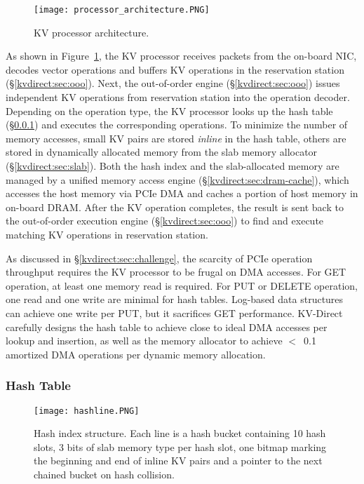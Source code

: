 \begin{figure}[t]
\centering
\texttt{[image: processor\_architecture.PNG]}
\caption{KV processor architecture.}
\label{kvdirect:fig:kvprocessor-arch}

\end{figure}

As shown in Figure~\ref{kvdirect:fig:kvprocessor-arch}, the KV processor receives packets from the on-board NIC, decodes vector operations and buffers KV operations in the reservation station (\S\ref{kvdirect:sec:ooo}).
Next, the out-of-order engine (\S\ref{kvdirect:sec:ooo}) issues independent KV operations from reservation station into the operation decoder.
Depending on the operation type, the KV processor looks up the hash table (\S\ref{kvdirect:sec:hashtable}) and executes the corresponding operations.
To minimize the number of memory accesses, small KV pairs are stored \textit{inline} in the hash table, others are stored in dynamically allocated memory from the slab memory allocator (\S\ref{kvdirect:sec:slab}).
Both the hash index and the slab-allocated memory are managed by a unified memory access engine (\S\ref{kvdirect:sec:dram-cache}), which accesses the host memory via PCIe DMA and caches a portion of host memory in on-board DRAM.
After the KV operation completes, the result is sent back to the out-of-order execution engine (\S\ref{kvdirect:sec:ooo}) to find and execute matching KV operations in reservation station.

As discussed in \S\ref{kvdirect:sec:challenge}, the scarcity of PCIe operation throughput requires the KV processor to be frugal on DMA accesses.
For GET operation, at least one memory read is required.
For PUT or DELETE operation, one read and one write are minimal for hash tables.
Log-based data structures can achieve one write per PUT, but it sacrifices GET performance.
KV-Direct carefully designs the hash table to achieve close to ideal DMA accesses per lookup and insertion, as well as the memory allocator to achieve $<$~0.1 amortized DMA operations per dynamic memory allocation.

\subsubsection{Hash Table}
\label{kvdirect:sec:hashtable}

\begin{figure}[t]
\centering
\texttt{[image: hashline.PNG]}
\caption{Hash index structure. Each line is a hash bucket containing 10 hash slots, 3 bits of slab memory type per hash slot, one bitmap marking the beginning and end of inline KV pairs and a pointer to the next chained bucket on hash collision.}
\label{kvdirect:fig:hashtable}

\end{figure}

